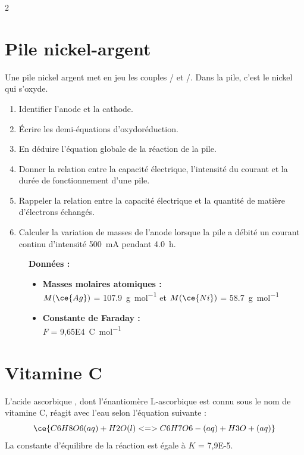 \documentclass[a4paper,11pt,fleqn]{article}%
\begin{document}
\begin{multicols}{2}
\section{Pile nickel-argent}
Une pile nickel argent met en jeu les couples / et /. Dans la pile, c'est le nickel  qui s'oxyde.

\begin{enumerate}
    \item Identifier l'anode et la cathode.
    \item Écrire les demi-équations d'oxydoréduction.
    \item En déduire l'équation globale de la réaction de la pile.
    \item Donner la relation entre la capacité électrique, l'intensité du courant et la durée de fonctionnement d'une pile.
    \item Rappeler la relation entre la capacité électrique et la quantité de matière d'électrons échangés.
    \item Calculer la variation de masses de l'anode lorsque la pile a débité un courant continu d'intensité \SI{500}{\milli\ampere} pendant \SI{4,0}{\hour}.
\end{enumerate}

\begin{figure}[H]
    \begin{minipage}{\linewidth}
     \textbf{Données :}
     \begin{itemize}
        \item \textbf{Masses molaires atomiques :}\\
        $M(\ce{Ag})$ = \SI{107,9}{\gram\per\mole} et $M(\ce{Ni})$ = \SI{58,7}{\gram\per\mole}
        \item \textbf{Constante de Faraday :}\\ $F$ = \SI{9,65E4}{\coulomb\per\mole}
    \end{itemize}
    \end{minipage}
\end{figure}

\section{Vitamine C}
L'acide ascorbique , dont l'énantiomère L-ascorbique est connu sous le nom de vitamine C, réagit avec l'eau selon l'équation suivante :
$$\ce{C6H8O6(aq) + H2O(l) <=> C6H7O6-(aq) + H3O+(aq)}$$
La constante d'équilibre de la réaction est égale à $K$ = \num{7,9E-5}.


\end{multicols}
\end{document}

